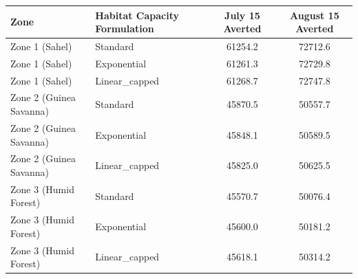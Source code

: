 \begin{tabular}{llcc}
\hline
Zone & Habitat Capacity Formulation & July 15 Averted & August 15 Averted \\
\hline
Zone 1 (Sahel) & Standard & 61254.2 & 72712.6 \\
Zone 1 (Sahel) & Exponential & 61261.3 & 72729.8 \\
Zone 1 (Sahel) & Linear_capped & 61268.7 & 72747.8 \\
Zone 2 (Guinea Savanna) & Standard & 45870.5 & 50557.7 \\
Zone 2 (Guinea Savanna) & Exponential & 45848.1 & 50589.5 \\
Zone 2 (Guinea Savanna) & Linear_capped & 45825.0 & 50625.5 \\
Zone 3 (Humid Forest) & Standard & 45570.7 & 50076.4 \\
Zone 3 (Humid Forest) & Exponential & 45600.0 & 50181.2 \\
Zone 3 (Humid Forest) & Linear_capped & 45618.1 & 50314.2 \\
\hline
\end{tabular}

